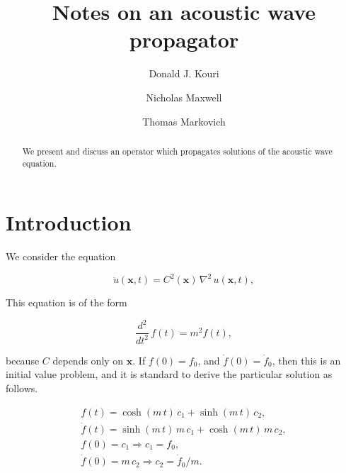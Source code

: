 \documentclass[amsmath,amssymb,floatfix]{revtex4}
\numberwithin{equation}{section}
\begin{document}
\title{Notes on an acoustic wave propagator}

\author{Donald J. Kouri}
\author{Nicholas Maxwell}
\author{Thomas Markovich}



\begin{abstract}
We present and discuss an operator which propagates solutions of the acoustic wave equation.
\end{abstract}

\maketitle


\section{\label{sec:level1}Introduction\protect}

\noindent
We consider the equation


\begin{equation}
	\ddot{u}(\mathbf{x},t)  = C^2(\mathbf{x}) \, \nabla^2 \, u(\mathbf{x},t),
\end{equation}




\noindent
This equation is of the form

\begin{equation}
	 \frac{d^2}{d t^2} \, f(t)  = m^2 f(t),
\end{equation}

\noindent
because $C$ depends only on $\mathbf{x}$. If $f(0) = f_0$, and $\dot{f}(0) = \dot{f}_0$, then this is an initial value problem, and it is standard to derive the particular solution as follows.


\begin{eqnarray}
	 f(t)  =  \cosh{(m \, t)} \,  c_1 + \sinh{(m \, t)} \,  c_2,  \nonumber \\	
	 \dot{f}(t)  =  \sinh{(m \, t)} \,m \,  c_1 + \cosh{(m \, t)} \,m \,  c_2, \nonumber \\	 
	 f(0)  =    c_1 \Rightarrow c_1 = f_0,  \nonumber \\	
	 \dot{f}(0)  = m \,  c_2 \Rightarrow c_2 = \dot{f}_0/m  . \nonumber  \\	 
\end{eqnarray}
\end{document}
